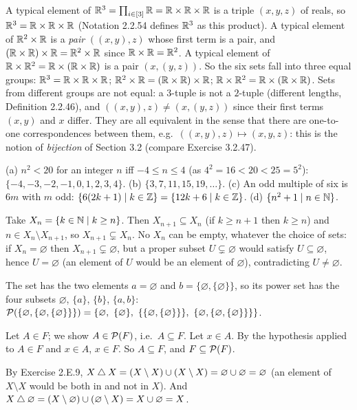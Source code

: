  A typical element of $\mathbb{R}^3=\prod_{i\in[3]}\mathbb{R}=\mathbb{R}\times\mathbb{R}\times\mathbb{R}$ is a triple $(x,y,z)$ of reals, so $\mathbb{R}^3=\mathbb{R}\times\mathbb{R}\times\mathbb{R}$ (Notation 2.2.54 defines $\mathbb{R}^3$ as this product). A typical element of $\mathbb{R}^2\times\mathbb{R}$ is a \emph{pair} $((x,y),z)$ whose first term is a pair, and $(\mathbb{R}\times\mathbb{R})\times\mathbb{R}=\mathbb{R}^2\times\mathbb{R}$ since $\mathbb{R}\times\mathbb{R}=\mathbb{R}^2$. A typical element of $\mathbb{R}\times\mathbb{R}^2=\mathbb{R}\times(\mathbb{R}\times\mathbb{R})$ is a pair $(x,(y,z))$. So the six sets fall into three equal groups: $\mathbb{R}^3=\mathbb{R}\times\mathbb{R}\times\mathbb{R}$; $\mathbb{R}^2\times\mathbb{R}=(\mathbb{R}\times\mathbb{R})\times\mathbb{R}$; $\mathbb{R}\times\mathbb{R}^2=\mathbb{R}\times(\mathbb{R}\times\mathbb{R})$. Sets from different groups are not equal: a $3$-tuple is not a $2$-tuple (different lengths, Definition 2.2.46), and $((x,y),z)\ne(x,(y,z))$ since their first terms $(x,y)$ and $x$ differ. They are all equivalent in the sense that there are one-to-one correspondences between them, e.g.\ $((x,y),z)\mapsto(x,y,z)$: this is the notion of \emph{bijection} of Section 3.2 (compare Exercise 3.2.47).

 (a) $n^2<20$ for an integer $n$ iff $-4\le n\le4$ (as $4^2=16<20<25=5^2$): $\{-4,-3,-2,-1,0,1,2,3,4\}$. (b) $\{3,7,11,15,19,\dots\}$. (c) An odd multiple of six is $6m$ with $m$ odd: $\{6(2k+1)\mid k\in\mathbb{Z}\}=\{12k+6\mid k\in\mathbb{Z}\}$. (d) $\{n^2+1\mid n\in\mathbb{N}\}$.

 Take $X_n=\{k\in\mathbb{N}\mid k\ge n\}$. Then $X_{n+1}\subseteq X_n$ (if $k\ge n+1$ then $k\ge n$) and $n\in X_n\setminus X_{n+1}$, so $X_{n+1}\subsetneq X_n$. No $X_n$ can be empty, whatever the choice of sets: if $X_n=\varnothing$ then $X_{n+1}\subsetneq\varnothing$, but a proper subset $U\subsetneq\varnothing$ would satisfy $U\subseteq\varnothing$, hence $U=\varnothing$ (an element of $U$ would be an element of $\varnothing$), contradicting $U\ne\varnothing$.

 The set has the two elements $a=\varnothing$ and $b=\{\varnothing,\{\varnothing\}\}$, so its power set has the four subsets $\varnothing$, $\{a\}$, $\{b\}$, $\{a,b\}$:
$\PS(\{\varnothing,\{\varnothing,\{\varnothing\}\}\})=\{\varnothing,\ \{\varnothing\},\ \{\{\varnothing,\{\varnothing\}\}\},\ \{\varnothing,\{\varnothing,\{\varnothing\}\}\}\}$.

 Let $A\in F$; we show $A\in\mathcal{P}(F)$, i.e.\ $A\subseteq F$. Let $x\in A$. By the hypothesis applied to $A\in F$ and $x\in A$, $x\in F$. So $A\subseteq F$, and $F\subseteq\mathcal{P}(F)$.

 By Exercise 2.E.9, $X\mathbin{\triangle} X=(X\setminus X)\cup(X\setminus X)=\varnothing\cup\varnothing=\varnothing$ (an element of $X\setminus X$ would be both in and not in $X$). And $X\mathbin{\triangle}\varnothing=(X\setminus\varnothing)\cup(\varnothing\setminus X)=X\cup\varnothing=X$.

